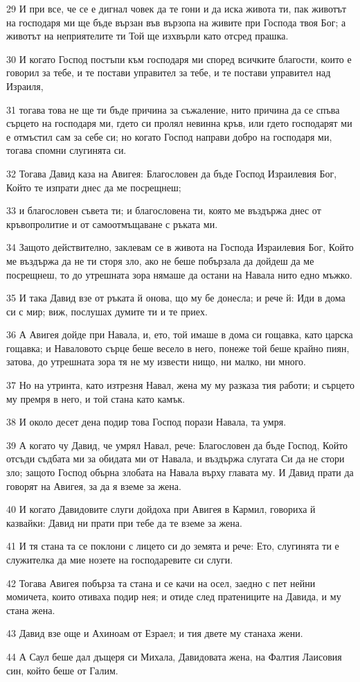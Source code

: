 \par 29 И при все, че се е дигнал човек да те гони и да иска живота ти, пак животът на господаря ми ще бъде вързан във вързопа на живите при Господа твоя Бог; а животът на неприятелите ти Той ще изхвърли като отсред прашка.
\par 30 И когато Господ постъпи към господаря ми според всичките благости, които е говорил за тебе, и те постави управител за тебе, и те постави управител над Израиля,
\par 31 тогава това не ще ти бъде причина за съжаление, нито причина да се спъва сърцето на господаря ми, гдето си пролял невинна кръв, или гдето господарят ми е отмъстил сам за себе си; но когато Господ направи добро на господаря ми, тогава спомни слугинята си.
\par 32 Тогава Давид каза на Авигея: Благословен да бъде Господ Израилевия Бог, Който те изпрати днес да ме посрещнеш;
\par 33 и благословен съвета ти; и благословена ти, която ме въздържа днес от кръвопролитие и от самоотмъщаване с ръката ми.
\par 34 Защото действително, заклевам се в живота на Господа Израилевия Бог, Който ме въздържа да не ти сторя зло, ако не беше побързала да дойдеш да ме посрещнеш, то до утрешната зора нямаше да остани на Навала нито едно мъжко.
\par 35 И така Давид взе от ръката й онова, що му бе донесла; и рече й: Иди в дома си с мир; виж, послушах думите ти и те приех.
\par 36 А Авигея дойде при Навала, и, ето, той имаше в дома си гощавка, като царска гощавка; и Наваловото сърце беше весело в него, понеже той беше крайно пиян, затова, до утрешната зора тя не му извести нищо, ни малко, ни много.
\par 37 Но на утринта, като изтрезня Навал, жена му му разказа тия работи; и сърцето му премря в него, и той стана като камък.
\par 38 И около десет дена подир това Господ порази Навала, та умря.
\par 39 А когато чу Давид, че умрял Навал, рече: Благословен да бъде Господ, Който отсъди съдбата ми за обидата ми от Навала, и въздържа слугата Си да не стори зло; защото Господ обърна злобата на Навала върху главата му. И Давид прати да говорят на Авигея, за да я вземе за жена.
\par 40 И когато Давидовите слуги дойдоха при Авигея в Кармил, говориха й казвайки: Давид ни прати при тебе да те вземе за жена.
\par 41 И тя стана та се поклони с лицето си до земята и рече: Ето, слугинята ти е служителка да мие нозете на господаревите си слуги.
\par 42 Тогава Авигея побърза та стана и се качи на осел, заедно с пет нейни момичета, които отиваха подир нея; и отиде след пратениците на Давида, и му стана жена.
\par 43 Давид взе още и Ахиноам от Езраел; и тия двете му станаха жени.
\par 44 А Саул беше дал дъщеря си Михала, Давидовата жена, на Фалтия Лаисовия син, който беше от Галим.

